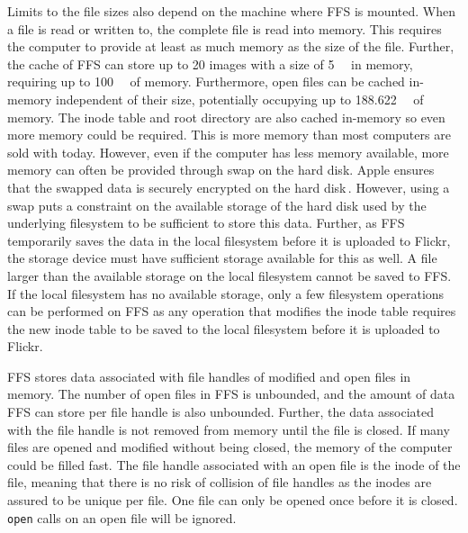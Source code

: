 Limits to the file sizes also depend on the machine where \gls{FFS} is mounted. When a file is read or written to, the complete file is read into memory. This requires the computer to provide at least as much memory as the size of the file. Further, the cache of \gls{FFS} can store up to 20 images with a size of \SI{5}{\mega\byte} in memory, requiring up to \SI{100}{\mega\byte} of memory. Furthermore, open files can be cached in-memory independent of their size, potentially occupying up to \SI{188.622}{\giga\byte} of memory. The inode table and root directory are also cached \mbox{in-memory} so even more memory could be required. This is more memory than most computers are sold with today. However, even if the computer has less memory available, more memory can often be provided through swap on the hard disk. Apple ensures that the swapped data is securely encrypted on the hard disk\,\cite{appleinc.WhatSecureVirtual}. However, using a swap puts a constraint on the available storage of the hard disk used by the underlying filesystem to be sufficient to store this data. Further, as \gls{FFS} temporarily saves the data in the local filesystem before it is uploaded to Flickr, the storage device must have sufficient storage available for this as well. A file larger than the available storage on the local filesystem cannot be saved to \gls{FFS}. If the local filesystem has no available storage, only a few filesystem operations can be performed on \gls{FFS} as any operation that modifies the inode table requires the new inode table to be saved to the local filesystem before it is uploaded to Flickr. 

\gls{FFS} stores data associated with file handles of modified and open files in memory. The number of open files in \gls{FFS} is unbounded, and the amount of data \gls{FFS} can store per file handle is also unbounded. Further, the data associated with the file handle is not removed from memory until the file is closed. If many files are opened and modified without being closed, the memory of the computer could be filled fast. The file handle associated with an open file is the inode of the file, meaning that there is no risk of collision of file handles as the inodes are assured to be unique per file. One file can only be opened once before it is closed. \texttt{open} calls on an open file will be ignored.

